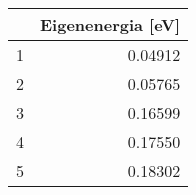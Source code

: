\begin{tabular}{lr}
\toprule
{} &  Eigenenergia [eV] \\
\midrule
1 &            0.04912 \\
2 &            0.05765 \\
3 &            0.16599 \\
4 &            0.17550 \\
5 &            0.18302 \\
\bottomrule
\end{tabular}
